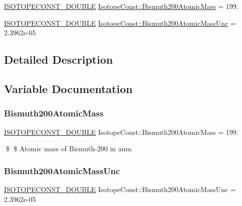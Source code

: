 \begin{DoxyCompactItemize}
\item 
\mbox{\hyperlink{group___isotope_const-_macros_ga8f45a7272ce02c0b4c65c44636ed719a}{I\+S\+O\+T\+O\+P\+E\+C\+O\+N\+S\+T\+\_\+\+D\+O\+U\+B\+LE}} \mbox{\hyperlink{group___isotope_const-_bismuth-_bi200_ga0a0ee59c5c882af554433e847a7233b1}{Isotope\+Const\+::\+Bismuth200\+Atomic\+Mass}} = 199.
\item 
\mbox{\hyperlink{group___isotope_const-_macros_ga8f45a7272ce02c0b4c65c44636ed719a}{I\+S\+O\+T\+O\+P\+E\+C\+O\+N\+S\+T\+\_\+\+D\+O\+U\+B\+LE}} \mbox{\hyperlink{group___isotope_const-_bismuth-_bi200_ga236d44d348ad1b52bfbe5f2b4dec9ae7}{Isotope\+Const\+::\+Bismuth200\+Atomic\+Mass\+Unc}} = 2.\+3962e-\/05
\end{DoxyCompactItemize}


\subsection{Detailed Description}


\subsection{Variable Documentation}
\mbox{\label{group___isotope_const-_bismuth-_bi200_ga0a0ee59c5c882af554433e847a7233b1}} 
\subsubsection{\texorpdfstring{Bismuth200\+Atomic\+Mass}{Bismuth200AtomicMass}}
{\footnotesize\ttfamily \mbox{\hyperlink{group___isotope_const-_macros_ga8f45a7272ce02c0b4c65c44636ed719a}{I\+S\+O\+T\+O\+P\+E\+C\+O\+N\+S\+T\+\_\+\+D\+O\+U\+B\+LE}} Isotope\+Const\+::\+Bismuth200\+Atomic\+Mass = 199.}

\$ \$ Atomic mass of Bismuth-\/200 in amu. \mbox{\label{group___isotope_const-_bismuth-_bi200_ga236d44d348ad1b52bfbe5f2b4dec9ae7}} 
\subsubsection{\texorpdfstring{Bismuth200\+Atomic\+Mass\+Unc}{Bismuth200AtomicMassUnc}}
{\footnotesize\ttfamily \mbox{\hyperlink{group___isotope_const-_macros_ga8f45a7272ce02c0b4c65c44636ed719a}{I\+S\+O\+T\+O\+P\+E\+C\+O\+N\+S\+T\+\_\+\+D\+O\+U\+B\+LE}} Isotope\+Const\+::\+Bismuth200\+Atomic\+Mass\+Unc = 2.\+3962e-\/05}

